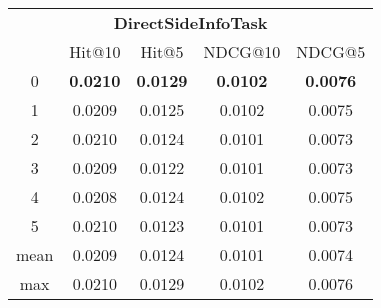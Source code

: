 \documentclass{article}
\begin{document}
 

\begin{tabular}{c|cccc}

\multicolumn{5}{c}{\textbf{DirectSideInfoTask}} \\
\noalign{\smallskip}
\noalign{\smallskip}
\toprule
\multicolumn{1}{c}{Template ID}	&	\multicolumn{1}{|c}{Hit@10}	&	\multicolumn{1}{c}{Hit@5}	&	\multicolumn{1}{c}{NDCG@10}	&	\multicolumn{1}{c}{NDCG@5}\\
\midrule
0	&	\textbf{0.0210}	&	\textbf{0.0129}	&	\textbf{0.0102}	&	\textbf{0.0076}\\
1	&	0.0209	&	0.0125	&	0.0102	&	0.0075\\
2	&	0.0210	&	0.0124	&	0.0101	&	0.0073\\
3	&	0.0209	&	0.0122	&	0.0101	&	0.0073\\
4	&	0.0208	&	0.0124	&	0.0102	&	0.0075\\
5	&	0.0210	&	0.0123	&	0.0101	&	0.0073\\
\midrule
mean	&	0.0209	&	0.0124	&	0.0101	&	0.0074\\
max	&	0.0210	&	0.0129	&	0.0102	&	0.0076\\
\bottomrule

\end{tabular}
\end{document}
